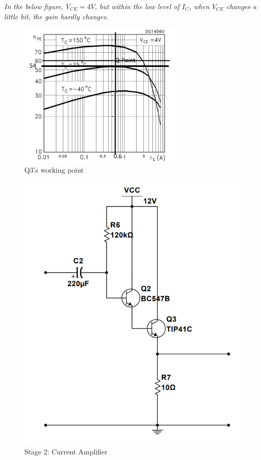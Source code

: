 \documentclass[twoside, a4paper, leqno]{article}
\begin{document}
		\textit{In the below figure, $V_{CE} = 4V$, but within the low level of $I_C$, when $V_{CE}$ changes a little bit, the gain hardly changes.}
		\begin{center}
			\begin{figure}[htp]
				\begin{center}
					\includegraphics[height=7cm]{figure/Q_point_TIP.png}
				\end{center}
				\caption{Q3's working point}
				\label{refFigure5}
			\end{figure}
			\begin{figure}[htp]
				\begin{center}
					\includegraphics[scale = .5]{figure/Stage2.png}
				\end{center}
				\caption{Stage 2: Current Amplifier}
				\label{refFigure6}
			\end{figure}
		\end{center}
	
\end{document}
